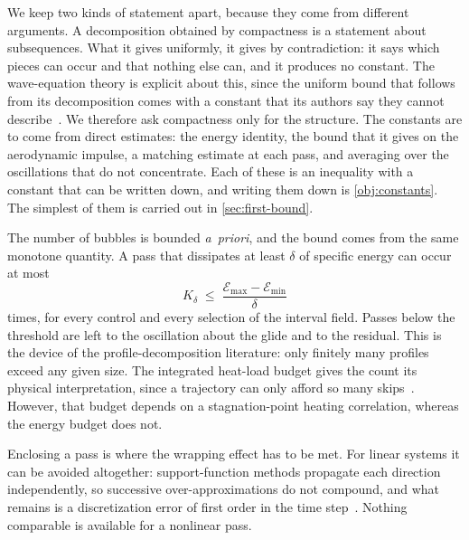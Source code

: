 \documentclass[english,11pt]{extarticle}
\begin{document}
We keep two kinds of statement apart, because they come from different
arguments. A decomposition obtained by compactness is a statement about
subsequences. What it gives uniformly, it gives by contradiction: it says
which pieces can occur and that nothing else can, and it produces no
constant. The wave-equation theory is explicit about this, since the uniform
bound that follows from its decomposition comes with a constant that its
authors say they cannot describe~\cite[Corollary~2]{bahouri1999high}. We
therefore ask compactness only for the structure. The constants are to come
from direct estimates: the energy identity, the bound that it gives on the
aerodynamic impulse, a matching estimate at each pass, and averaging over
the oscillations that do not concentrate. Each of these is an inequality
with a constant that can be written down, and writing them down is
\cref{obj:constants}. The simplest of them is carried out in
\cref{sec:first-bound}.

The number of bubbles is bounded \emph{a~priori}, and the bound comes from
the same monotone quantity. A pass that dissipates at least $\delta$ of
specific energy can occur at most
\begin{equation}\label{eq:kmax}
  K_\delta \;\le\; \frac{\mathcal{E}_{\max}-\mathcal{E}_{\min}}{\delta}
\end{equation}
times, for every control and every selection of the interval field. Passes
below the threshold are left to the oscillation about the glide and to the
residual. This is the device of the profile-decomposition literature: only
finitely many profiles exceed any given size. The integrated heat-load
budget gives the count its physical interpretation, since a trajectory can
only afford so many skips~\cite{shi1971skip,eggers1958comparative}.
However, that budget depends on a stagnation-point heating correlation,
whereas the energy budget does not.

Enclosing a pass is where the wrapping effect has to be met. For linear
systems it can be avoided altogether: support-function methods propagate
each direction independently, so successive over-approximations do not
compound, and what remains is a discretization error of first order in the
time step~\cite{leguernic2010reachability}. Nothing comparable is available
for a nonlinear pass.
\end{document}
